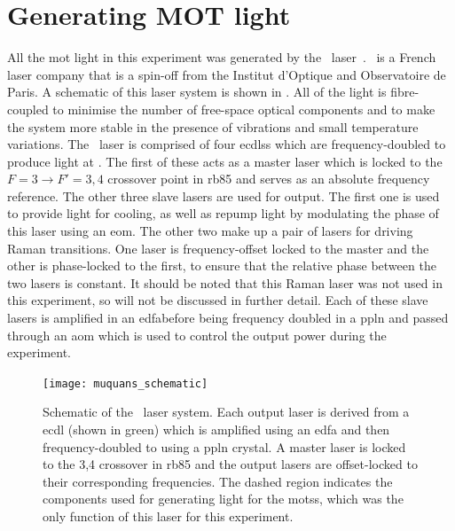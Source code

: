 \section{Generating MOT light}\label{sec:muquans_light}
All the \ac{mot} light in this experiment was generated by the \Muquans\
laser~\cite{muquansWebPage}. \Muquans\ is a French laser company that is a
spin-off from the Institut d'Optique and Observatoire de Paris. A schematic of
this laser system is shown in \FigureRef{fig:muquans_schematic}. All of the
light is fibre-coupled to minimise the number of free-space optical components
and to make the system more stable in the presence of vibrations and small
temperature variations. The \Muquans\ laser is comprised of four
\sivalue{1560}{\nano\metre} \acp{ecdls} which are frequency-doubled to produce
light at \sivalue{780}{\nano\metre}. The first of these acts as a master laser
which is locked to the \(F = 3 \rightarrow F' = 3,4\) crossover point in
\ac{rb85} and serves as an absolute frequency reference. The other three slave
lasers are used for output. The first one is used to provide light for cooling,
as well as repump light by modulating the phase of this laser using an \ac{eom}.
The other two make up a pair of lasers for driving Raman transitions. One laser
is frequency-offset locked to the master and the other is phase-locked to the
first, to ensure that the relative phase between the two lasers is constant. It
should be noted that this Raman laser was not used in this experiment, so will
not be discussed in further detail. Each of these slave lasers is amplified in
an \ac{edfa}before being frequency doubled in a \ac{ppln} and passed through an
\ac{aom} which is used to control the output power during the experiment.
\begin{figure}
	\texttt{[image: muquans\_schematic]}
	\caption[\Muquans\ Laser System Diagram]{Schematic of the \Muquans\ laser system. Each output laser is derived from a \acs{ecdl} (shown in green) which is amplified using an \acs{edfa} and then frequency-doubled to  using a \acs{ppln} crystal. A master laser is locked to the 3,4 crossover in \ac{rb85} and the output lasers are offset-locked to their corresponding frequencies. The dashed region indicates the components used for generating light for the \acp{mots}, which was the only function of this laser for this experiment.}\label{fig:muquans_schematic}
\end{figure}
